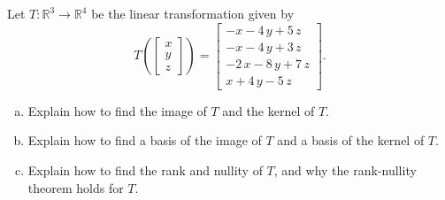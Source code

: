 
\begin{exerciseStatement}
 Let \(T:\mathbb{R}^ 3  \to \mathbb{R}^ 4 \) be the linear transformation given by \[T\left(  \left[\begin{array}{c}
x \\
y \\
z
\end{array}\right]  \right) =  \left[\begin{array}{c}
-x - 4 \, y + 5 \, z \\
-x - 4 \, y + 3 \, z \\
-2 \, x - 8 \, y + 7 \, z \\
x + 4 \, y - 5 \, z
\end{array}\right] .\]
\begin{enumerate}[(a)]
\item Explain how to find the image of \(T\) and the kernel of \(T\).
\item Explain how to find a basis of the image of \(T\) and a basis of the kernel of \(T\).
\item Explain how to find the rank and nullity of \(T\), and why the rank-nullity theorem holds for \(T\).
\end{enumerate}
    
\end{exerciseStatement}
    
